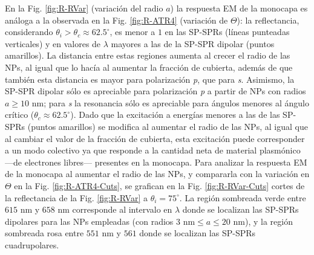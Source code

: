 En la Fig.   \ref{fig:R-RVar} (variación del radio $a$) la respuesta EM de la monocapa es análoga a la observada en la Fig. \ref{fig:R-ATR4} (variación de $\Theta$): la reflectancia, considerando $\theta_i>\theta_c\approx 62.5^\circ$, es menor a $1$ en las SP-SPRs (líneas punteadas verticales) y en valores de $\lambda$ mayores a las de la SP-SPR dipolar (puntos amarillos). La distancia entre estas regiones aumenta al crecer el radio de las NPs, al igual que lo hacía al aumentar la fracción de cubierta, además de que también esta distancia es mayor para polarización \emph{p}, que para \emph{s}. Asimismo, la SP-SPR dipolar sólo es apreciable para polarización \emph{p} a partir de NPs con radios $a\geq 10$ nm; para \emph{s} la resonancia sólo es apreciable para ángulos menores al ángulo crítico ($\theta_c\approx 62.5^\circ$). Dado que la excitación a energías menores a las de las SP-SPRs (puntos amarillos) se modifica al aumentar el radio de las NPs, al igual que al cambiar el valor de la fracción de cubierta, esta excitación puede corresponder a un modo colectivo ya que responde a la cantidad neta de material plasmónico ---de electrones libres--- presentes en la monocapa. Para analizar la respuesta EM de la monocapa al aumentar el radio de las NPs, y compararla con la variación en $\Theta$ en la Fig. \ref{fig:R-ATR4-Cuts},  se grafican en la Fig. \ref{fig:R-RVar-Cuts}  cortes de la reflectancia de la Fig. \ref{fig:R-RVar} a $\theta_i = 75^\circ$. La región sombreada verde entre $615$ nm y $658$ nm corresponde al intervalo en $\lambda$ donde se localizan las SP-SPRs dipolares para las NPs empleadas (con radios $3\mbox{ nm}\leq a \leq 20\mbox{ nm}$), y la región sombreada rosa entre $551$ nm y $561$ donde se localizan las SP-SPRs cuadrupolares.

